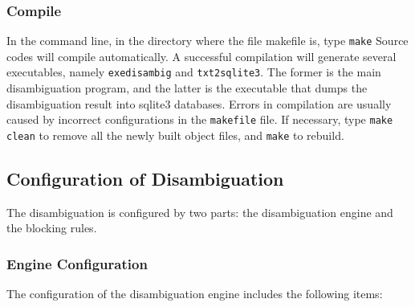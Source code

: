 \documentclass{article}
\begin{document}
\subsubsection{Compile}

In the command line, in the directory where the
file makefile is, type \texttt{make}
Source codes will compile automatically. A successful
compilation will generate several executables, namely
\texttt{exedisambig} and \texttt{txt2sqlite3}.
The former is the main disambiguation program, and the
latter is the executable that dumps the disambiguation
result into sqlite3 databases. Errors in compilation are
usually caused by incorrect configurations in
the \texttt{makefile} file. If necessary, type
\texttt{make clean} to remove all the newly built
object files, and \texttt{make} to rebuild.


\subsection{Configuration of Disambiguation}

The disambiguation is configured by two parts:
the disambiguation engine and the blocking rules.


\subsubsection{Engine Configuration}

The configuration of the disambiguation engine
includes the following items:
\end{document}
